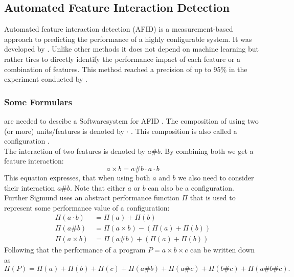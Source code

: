 

\subsection{Automated Feature Interaction Detection}\label{sec:AFID}

Automated feature interaction detection (AFID) is a measurement-based approach to predicting the performance of a highly configurable system.
It was developed by \citet{AutomatedFeatureDetectionSiegmund2012}. Unlike other methods it does not depend on machine learning but rather tires to directly identify the performance impact of each feature or a combination of features. This method reached a precision of up to 95\% in the experiment conducted by  \citet{AutomatedFeatureDetectionSiegmund2012}.

\subsubsection[Formulars]{\textnormal{Some} Formulars} are needed to descibe a Softwaresystem for AFID .
The composition of using two (or more) units/features is denoted by $\cdot$ . This composition is also called a configuration \cite{VariabilityAwarePerformancePredictionJianmeiSigmundApel}.\\
The interaction of two features is denoted by $a\#b$. By combining both we get a feature interaction:
\begin{equation}
 a \times b = a\#b \cdot a \cdot b
\end{equation} 
This equation expresses, that when using both $a$ and $b$ we also need to consider their interaction $a\# b$. Note that either $a$ or $b$ can also be a configuration.\\
Further Sigmund uses an abstract performance function $\Pi$ that is used to represent some performance value of a configuration:
\begin{align}
\Pi(a \cdot b) &= \Pi(a) + \Pi(b)\label{eq:featureInteraction_SimplePerformance}\\
\Pi(a\#b) &= \Pi(a \times b) - (\Pi(a) + \Pi(b))\\
\Pi(a \times b) &=  \Pi(a\#b) + (\Pi(a) + \Pi(b))\label{eq:featureInteraction_InteractionPerformances}
\end{align}
Following that the performance of a program $P = a \times b \times c$ can be written down as
\begin{equation}\label{eq:featureInteraction_ProgrammPerformance}
\Pi(P) = \Pi(a) +  \Pi(b) +  \Pi(c) +  \Pi(a\#b) +  \Pi(a\#c) +  \Pi(b\#c) +  \Pi(a\#b\#c). 
\end{equation}

